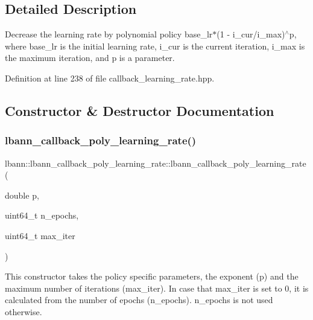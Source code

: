 \subsection{Detailed Description}
Decrease the learning rate by polynomial policy base\+\_\+lr$\ast$(1 -\/ i\+\_\+cur/i\+\_\+max)$^\wedge$p, where base\+\_\+lr is the initial learning rate, i\+\_\+cur is the current iteration, i\+\_\+max is the maximum iteration, and p is a parameter. 

Definition at line 238 of file callback\+\_\+learning\+\_\+rate.\+hpp.



\subsection{Constructor \& Destructor Documentation}
\mbox{\label{classlbann_1_1lbann__callback__poly__learning__rate_ac36d25516687e0d0c43b51acae9eb1ff}} 
\subsubsection{\texorpdfstring{lbann\+\_\+callback\+\_\+poly\+\_\+learning\+\_\+rate()}{lbann\_callback\_poly\_learning\_rate()}\hspace{0.1cm}{\footnotesize\ttfamily [1/3]}}
{\footnotesize\ttfamily lbann\+::lbann\+\_\+callback\+\_\+poly\+\_\+learning\+\_\+rate\+::lbann\+\_\+callback\+\_\+poly\+\_\+learning\+\_\+rate (\begin{DoxyParamCaption}\item[{double}]{p,  }\item[{uint64\+\_\+t}]{n\+\_\+epochs,  }\item[{uint64\+\_\+t}]{max\+\_\+iter }\end{DoxyParamCaption})}

This constructor takes the policy specific parameters, the exponent (p) and the maximum number of iterations (max\+\_\+iter). In case that max\+\_\+iter is set to 0, it is calculated from the number of epochs (n\+\_\+epochs). n\+\_\+epochs is not used otherwise. 


